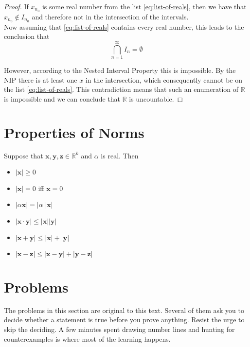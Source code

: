 \begin{proof}
If $x_{n_0}$ is some real number from the list \eqref{eq:list-of-reals}, then we have that $x_{n_0} \notin I_{n_0}$ and therefore not in the intersection of the intervals.\\  Now assuming that \eqref{eq:list-of-reals} contains every real number, this leads to the conclusion that 
\[ \bigcap_{n=1}^{\infty}I_n = \emptyset \]

However, according to the Nested Interval Property this is impossible.  By the NIP there is at least one $x$ in the intersection, which consequently cannot be on the list \eqref{eq:list-of-reals}.  This contradiction means that such an enumeration of $\mathbb{R}$ is impossible and we can conclude that $\mathbb{R}$ is uncountable.



\end{proof}

\section{Properties of Norms}


Suppose that $\mathbf{x,y,z} \in \mathbb{R}^k$ and $\alpha$ is real. Then
\begin{itemize}[$\diamond$]
	\item $|\mathbf{x}| \geq 0$
	\item $|\mathbf{x}| = 0$ iff $\mathbf{x} = 0$
	\item $|\alpha \mathbf{x}| = |\alpha||\mathbf{x}|$
	\item $|\mathbf{x} \cdot \mathbf{y}| \leq |\mathbf{x}| |\mathbf{y}| $
	\item $|\mathbf{x+y}| \leq |\mathbf{x}|  + |\mathbf{y}|$
	\item $|\mathbf{x}- \mathbf{z}| \leq |\mathbf{x-y}| + |\mathbf{y-z}|$     
\end{itemize}





\section{Problems}

\noindent The problems in this section are original to this text.  Several of them ask you to decide whether a statement is true before you prove anything.  Resist the urge to skip the deciding.  A few minutes spent drawing number lines and hunting for counterexamples is where most of the learning happens.

